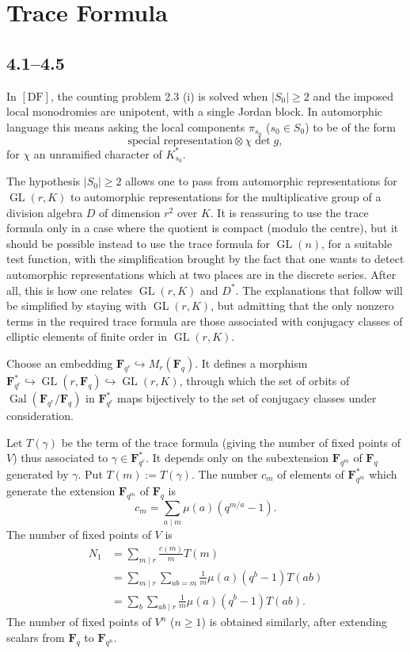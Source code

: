\documentclass[11pt]{article}
\newcommand{\Fq}{\mathbf F_q}
\newcommand{\GL}{\operatorname{GL}}
\newcommand{\Gal}{\operatorname{Gal}}
\begin{document}
\section{Trace Formula}

\subsection{4.1--4.5}
In \([\mathrm{DF}]\), the counting problem 2.3 (i) is solved when \(|S_0|\ge 2\) and the imposed local monodromies are unipotent, with a single Jordan block. In automorphic language this means asking the local components \(\pi_{s_0}\) (\(s_0\in S_0\)) to be of the form
\begin{equation}\tag{4.1.1}
\text{special representation}\otimes \chi\det g,
\end{equation}
for \(\chi\) an unramified character of \(K_{s_0}^*\).

The hypothesis \(|S_0|\ge 2\) allows one to pass from automorphic representations for \(\GL(r,K)\) to automorphic representations for the multiplicative group of a division algebra \(D\) of dimension \(r^2\) over \(K\). It is reassuring to use the trace formula only in a case where the quotient is compact (modulo the centre), but it should be possible instead to use the trace formula for \(\GL(n)\), for a suitable test function, with the simplification brought by the fact that one wants to detect automorphic representations which at two places are in the discrete series. After all, this is how one relates \(\GL(r,K)\) and \(D^*\). The explanations that follow will be simplified by staying with \(\GL(r,K)\), but admitting that the only nonzero terms in the required trace formula are those associated with conjugacy classes of elliptic elements of finite order in \(\GL(r,K)\).

Choose an embedding \(\mathbf F_{q^r}\hookrightarrow M_r(\Fq)\). It defines a morphism \(\mathbf F_{q^r}^*\hookrightarrow\GL(r,\Fq)\hookrightarrow\GL(r,K)\), through which the set of orbits of \(\Gal(\mathbf F_{q^r}/\Fq)\) in \(\mathbf F_{q^r}^*\) maps bijectively to the set of conjugacy classes under consideration.

Let \(T(\gamma)\) be the term of the trace formula (giving the number of fixed points of \(V\)) thus associated to \(\gamma\in\mathbf F_{q^r}^*\). It depends only on the subextension \(\mathbf F_{q^m}\) of \(\Fq\) generated by \(\gamma\). Put \(T(m):=T(\gamma)\). The number \(c_m\) of elements of \(\mathbf F_{q^m}^*\) which generate the extension \(\mathbf F_{q^m}\) of \(\Fq\) is
\[
c_m=\sum_{a\mid m}\mu(a)(q^{m/a}-1).
\]
The number of fixed points of \(V\) is
\begin{align}\tag{4.1.2}
N_1&=\sum_{m\mid r}\frac{c(m)}{m}T(m)\\
&=\sum_{m\mid r}\sum_{ab=m}\frac1m\mu(a)(q^b-1)T(ab)\\
&=\sum_b\sum_{ab\mid r}\frac1m\mu(a)(q^b-1)T(ab).
\end{align}
The number of fixed points of \(V^n\) (\(n\ge 1\)) is obtained similarly, after extending scalars from \(\Fq\) to \(\mathbf F_{q^n}\).
\end{document}
